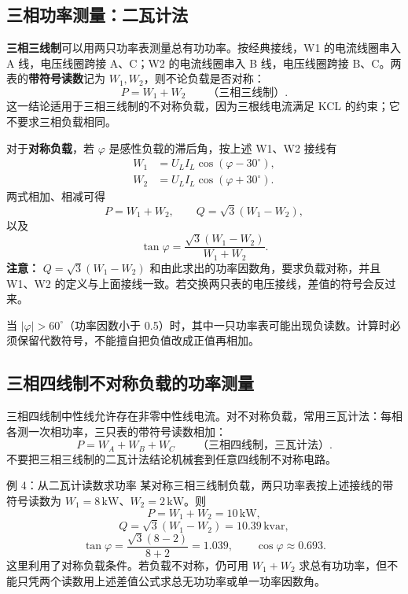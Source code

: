 \documentclass[circuit]{CarlosTexRpt}
\newcommand{\dgr}{^\circ}
\begin{document}
\subsection{三相功率测量：二瓦计法}

\textbf{三相三线制}可以用两只功率表测量总有功功率。按经典接线，W1 的电流线圈串入 A 线，电压线圈跨接 A、C；W2 的电流线圈串入 B 线，电压线圈跨接 B、C。两表的\textbf{带符号读数}记为 \(W_1,W_2\)，则不论负载是否对称：
\begin{equation}
  \boxed{P=W_1+W_2\qquad\text{（三相三线制）}}.
\end{equation}
这一结论适用于三相三线制的不对称负载，因为三根线电流满足 KCL 的约束；它不要求三相负载相同。

对于\textbf{对称负载}，若 \(\varphi\) 是感性负载的滞后角，按上述 W1、W2 接线有
\begin{align}
  W_1&=U_LI_L\cos(\varphi-30\dgr),\\
  W_2&=U_LI_L\cos(\varphi+30\dgr).
\end{align}
两式相加、相减可得
\begin{equation}
  \boxed{P=W_1+W_2},\qquad
  \boxed{Q=\sqrt3(W_1-W_2)},
\end{equation}
以及
\begin{equation}
  \boxed{\tan\varphi=\frac{\sqrt3(W_1-W_2)}{W_1+W_2}}.
\end{equation}
\textbf{注意：} \(Q=\sqrt3(W_1-W_2)\) 和由此求出的功率因数角，要求负载对称，并且 W1、W2 的定义与上面接线一致。若交换两只表的电压接线，差值的符号会反过来。

当 \(|\varphi|>60^\circ\)（功率因数小于 0.5）时，其中一只功率表可能出现负读数。计算时必须保留代数符号，不能擅自把负值改成正值再相加。

\subsection{三相四线制不对称负载的功率测量}

三相四线制中性线允许存在非零中性线电流。对不对称负载，常用三瓦计法：每相各测一次相功率，三只表的带符号读数相加：
\begin{equation}
  \boxed{P=W_A+W_B+W_C\qquad\text{（三相四线制，三瓦计法）}}.
\end{equation}
不要把三相三线制的二瓦计法结论机械套到任意四线制不对称电路。

\begin{examplebox}{例 4：从二瓦计读数求功率}
某对称三相三线制负载，两只功率表按上述接线的带符号读数为 \(W_1=8\,\mathrm{kW}\)、\(W_2=2\,\mathrm{kW}\)。则
\[
  P=W_1+W_2=10\,\mathrm{kW},
\]
\[
  Q=\sqrt3(W_1-W_2)=10.39\,\mathrm{kvar},
\]
\[
  \tan\varphi=\frac{\sqrt3(8-2)}{8+2}=1.039,\qquad
  \cos\varphi\approx0.693.
\]
这里利用了对称负载条件。若负载不对称，仍可用 \(W_1+W_2\) 求总有功功率，但不能只凭两个读数用上述差值公式求总无功功率或单一功率因数角。
\end{examplebox}
\end{document}
